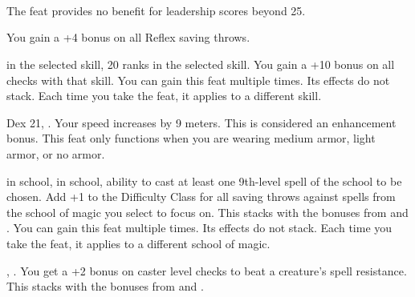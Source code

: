 {{\\

\\

\\

}
}
{The  feat provides no benefit for leadership scores beyond 25.}{}

{}{You gain a +4 bonus on all Reflex saving throws.}

{}
{ in the selected skill, 20 ranks in the selected skill.}
{You gain a +10 bonus on all checks with that skill.}
{}{You can gain this feat multiple times. Its effects do not stack. Each time you take the feat, it applies to a different skill.}

{}
{Dex 21, .}
{Your speed increases by 9 meters. This is considered an enhancement bonus.}
{}{This feat only functions when you are wearing medium armor, light armor, or no armor.}

{}
{ in school,  in school, ability to cast at least one 9th-level spell of the school to be chosen.}
{Add +1 to the Difficulty Class for all saving throws against spells from the school of magic you select to focus on. This stacks with the bonuses from  and .}
{}{You can gain this feat multiple times. Its effects do not stack. Each time you take the feat, it applies to a different school of magic.}

{, .}
{You get a +2 bonus on caster level checks to beat a creature's spell resistance. This stacks with the bonuses from  and .}


